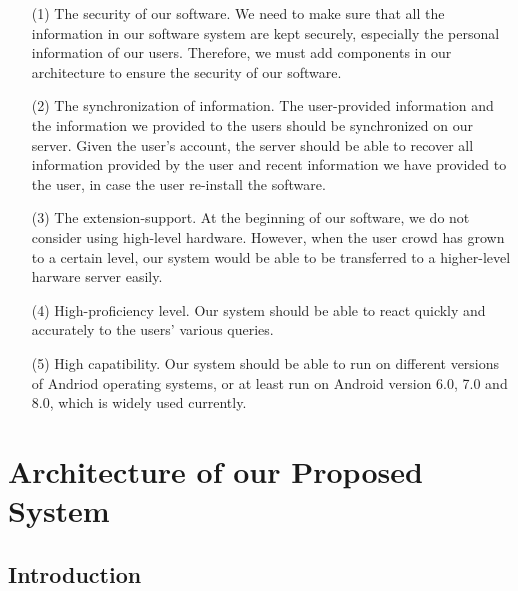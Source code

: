 \documentclass[10pt]{article}
\begin{document}
\begin{itemize}
	\item[(1)]The security of our software. We need to make sure that all the information in our software system are kept securely, especially the personal information of our users. Therefore, we must add components in our architecture to ensure the security of our software.
	\item[(2)]The synchronization of information. The user-provided information and the information we provided to the users should be synchronized on our server. Given the user’s account, the server should be able to recover all information provided by the user and recent information we have provided to the user, in case the user re-install the software.
	\item[(3)]The extension-support. At the beginning of our software, we do not consider using high-level hardware. However, when the user crowd has grown to a certain level, our system would be able to be transferred to a higher-level harware server easily.
	\item[(4)]High-proficiency level. Our system should be able to react quickly and accurately to the users’ various queries. 
	\item[(5)]High capatibility. Our system should be able to run on different versions of Andriod operating systems, or at least run on Android version 6.0, 7.0 and 8.0, which is widely used currently.
\end{itemize}

\section{Architecture of our Proposed System}
\subsection{Introduction}
\end{document}
